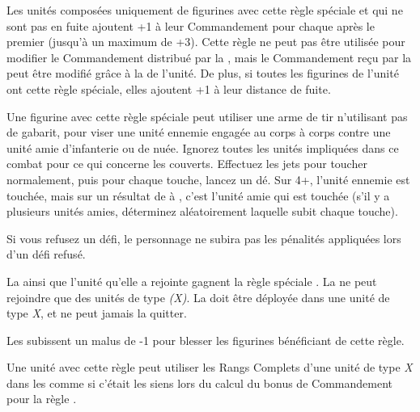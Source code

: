 

\startarmyspecialrules

\armyspecialruleentry{\safetyinnumbersrule}

Les unités composées uniquement de figurines avec cette règle spéciale et qui ne sont pas en fuite ajoutent +1 à leur Commandement pour chaque  après le premier (jusqu'à un maximum de +3). Cette règle ne peut pas être utilisée pour modifier le Commandement distribué par la \inspiringpresence{}, mais le Commandement reçu par la \inspiringpresence{} peut être modifié grâce à la \safetyinnumbers{} de l'unité. De plus, si toutes les figurines de l'unité ont cette règle spéciale, elles ajoutent +1 à leur distance de fuite.


\armyspecialruleentry{\callousrule}

Une figurine avec cette règle spéciale peut utiliser une arme de tir n'utilisant pas de gabarit, pour viser une unité ennemie engagée au corps à corps contre une unité amie d'infanterie ou de nuée. {Ignorez toutes les unités impliquées dans ce combat pour ce qui concerne les couverts}. Effectuez les jets pour toucher normalement, puis pour chaque touche, lancez un dé. Sur 4+, l'unité ennemie est touchée, mais sur un résultat de  à , c'est l'unité amie qui est touchée (s'il y a plusieurs unités amies, déterminez aléatoirement laquelle subit chaque touche).


\armyspecialruleentry{\honourlessrule}

Si vous refusez un défi, le personnage \honourless{} ne subira pas les pénalités appliquées lors d'un défi refusé.



La \warplatform{} ainsi que l'unité qu'elle a rejointe gagnent la règle spéciale \immunetopsychology{}. La \warplatform{} ne peut rejoindre que des unités de type \emph{(X)}. La \warplatform{} doit être déployée dans une unité de type \emph{X}, et ne peut jamais la quitter.


\armyspecialruleentry{\resistantrule}

Les \toxicattacks{} subissent un malus de -1 pour blesser les figurines bénéficiant de cette règle.



Une unité avec cette règle peut utiliser les Rangs Complets d'une unité de type \emph{X} dans les  comme si c'était les siens lors du calcul du bonus de Commandement pour la règle \safetyinnumbers{}.


